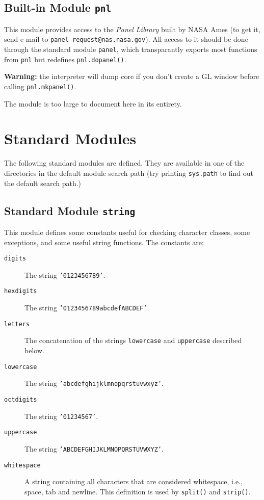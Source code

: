 \subsection{Built-in Module {\tt pnl}}

This module provides access to the
{\em Panel Library}
built by NASA Ames (to get it, send e-mail to
{\tt panel-request@nas.nasa.gov}).
All access to it should be done through the standard module
{\tt panel},
which transparantly exports most functions from
{\tt pnl}
but redefines
{\tt pnl.dopanel()}.

{\bf Warning:}
the {\Python} interpreter will dump core if you don't create a GL window
before calling
{\tt pnl.mkpanel()}.

The module is too large to document here in its entirety.

\section{Standard Modules}

The following standard modules are defined.
They are available in one of the directories in the default module
search path (try printing
{\tt sys.path}
to find out the default search path.)

\subsection{Standard Module {\tt string}}

This module defines some constants useful for checking character
classes, some exceptions, and some useful string functions.
The constants are:
\begin{description}
\item[{\tt digits}]
The string
{\tt '0123456789'}.
\item[{\tt hexdigits}]
The string
{\tt '0123456789abcdefABCDEF'}.
\item[{\tt letters}]
The concatenation of the strings
{\tt lowercase}
and
{\tt uppercase}
described below.
\item[{\tt lowercase}]
The string
{\tt 'abcdefghijklmnopqrstuvwxyz'}.
\item[{\tt octdigits}]
The string
{\tt '01234567'}.
\item[{\tt uppercase}]
The string
{\tt 'ABCDEFGHIJKLMNOPQRSTUVWXYZ'}.
\item[{\tt whitespace}]
A string containing all characters that are considered whitespace,
i.e.,
space, tab and newline.
This definition is used by
{\tt split()}
and
{\tt strip()}.
\end{description}

